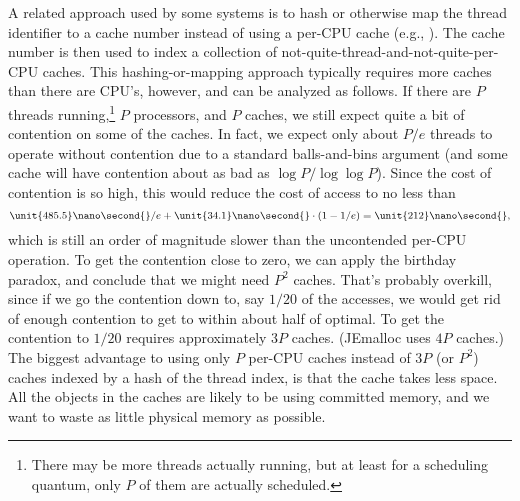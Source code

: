 \documentclass[pldi]{sigplanconf-pldi15}
\newcommand{\ns}[1]{\unit{#1}\nano\second{}}
\begin{document}
A related approach used by some systems is to hash or otherwise map
the thread identifier to a cache number instead of using a per-CPU
cache (e.g., \cite{LarsonKr98, Evans06}).  The cache number is then
used to index a collection of not-quite-thread-and-not-quite-per-CPU
caches.  This hashing-or-mapping approach typically requires more
caches than there are CPU's, however, and can be analyzed as follows.
If there are $P$ threads running,\footnote{There may be more threads
  actually running, but at least for a scheduling quantum, only $P$ of
  them are actually scheduled.} $P$ processors, and $P$ caches, we
still expect quite a bit of contention on some of the caches.  In
fact, we expect only about $P/e$ threads to operate without contention
due to a standard balls-and-bins argument (and some cache will have
contention about as bad as $\log P/\log\log P$).  Since the cost of
contention is so high, this would reduce the cost of access to no less
than
\[ \ns{485.5}/e + \ns{34.1}\cdot(1-1/e) = \ns{212},\]
which is still an order of magnitude slower than the uncontended
per-CPU operation.  To get the contention close to zero, we can apply
the birthday paradox, and conclude that we might need $P^2$ caches.
That's probably overkill, since if we go the contention down to, say
$1/20$ of the accesses, we would get rid of enough contention to get
to within about half of optimal.  To get the contention to $1/20$
requires approximately $3P$ caches.  (JEmalloc uses $4P$ caches.)  The
biggest advantage to using only $P$ per-CPU caches instead of $3P$ (or
$P^2$) caches indexed by a hash of the thread index, is that the cache
takes less space.  All the objects in the caches are likely to be
using committed memory, and we want to waste as little physical memory
as possible.
\end{document}
